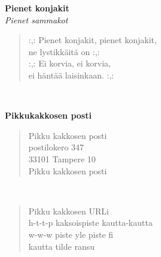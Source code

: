 %
%
\noindent\begin{minipage}{\linewidth}
\vspace{5pt}
\parbox[t]{0.85\linewidth}{\raggedright {\large\bf Pienet konjakit}\\[2pt]\small\emph{Pienet sammakot}\\[6pt]}
\begin{verse}
	
	\hspace{0pt-\widthof{:,: }}:,: Pienet konjakit, pienet konjakit,\\
	ne lystikkäitä on :,:\\
	\hspace{0pt-\widthof{:,: }}:,: Ei korvia, ei korvia,\\
	ei häntää laisinkaan. :,:\\
\end{verse}
\end{minipage}\\[10pt]
%
%
\noindent\begin{minipage}{\linewidth}
\vspace{5pt}
\parbox[t]{0.85\linewidth}{\raggedright {\large\bf Pikkukakkosen posti}\\[6pt]}
\begin{verse}
	Pikku kakkosen posti\\
	postilokero 347\\
	33101 Tampere 10\\
	Pikku kakkosen posti\\
\end{verse}
\end{minipage}\\[10pt]
\noindent\begin{minipage}{\linewidth}
\begin{verse}
	Pikku kakkosen URLi\\
	h-t-t-p kaksoispiste kautta-kautta\\
	w-w-w piste yle piste fi\\
	kautta tilde ransu\\
\end{verse}
\end{minipage}\\[10pt]
